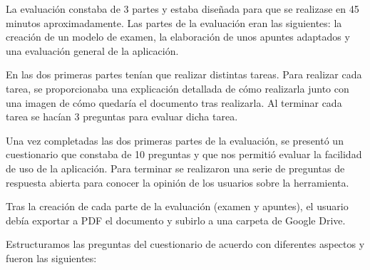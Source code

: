 La evaluación constaba de 3 partes y estaba diseñada para que se realizase en 45 minutos aproximadamente. Las partes de la evaluación eran las siguientes: la creación de un modelo de examen, la elaboración de unos apuntes adaptados y una evaluación general de la aplicación.

En las dos primeras partes tenían que realizar distintas tareas. Para realizar cada tarea, se proporcionaba una explicación detallada de cómo realizarla junto con una imagen de cómo quedaría el documento tras realizarla. Al terminar cada tarea se hacían 3 preguntas para evaluar dicha tarea.

Una vez completadas las dos primeras partes de la evaluación, se presentó un cuestionario que constaba de 10 preguntas y que nos permitió evaluar la facilidad de uso de la aplicación. Para terminar se realizaron una serie de preguntas de respuesta abierta para conocer la opinión de los usuarios sobre la herramienta.

Tras la creación de cada parte de la evaluación (examen y apuntes), el usuario debía exportar a PDF el documento y subirlo a una carpeta de Google Drive.

Estructuramos las preguntas del cuestionario de acuerdo con diferentes aspectos y fueron las siguientes:

